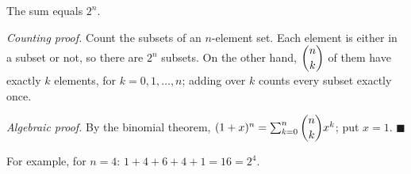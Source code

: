 The sum equals $\boxed{2^n}$.

\emph{Counting proof.} Count the subsets of an $n$-element set. Each element is either in a subset or not, so there are $2^n$ subsets. On the other hand, $\dbinom nk$ of them have exactly $k$ elements, for $k=0,1,\dots,n$; adding over $k$ counts every subset exactly once.

\emph{Algebraic proof.} By the binomial theorem, $(1+x)^n=\sum_{k=0}^n\dbinom nkx^k$; put $x=1$. $\blacksquare$

For example, for $n=4$: $1+4+6+4+1=16=2^4$.
